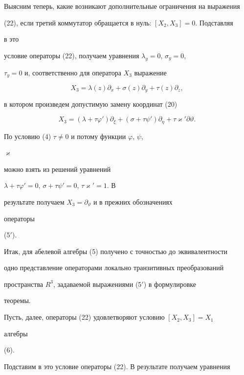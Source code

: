 Выясним теперь, какие возникают дополнительные ограничения на выражения 


(22), если третий коммутатор обращается в нуль: $[X_2,X_3]=0$. Подставляя 


в это 


условие операторы (22), получаем уравнения $\lambda_y=0$, $\sigma_y=0$, 


$\tau_y=0$ и, соответственно для оператора $X_3$ выражение


$$ 


X_3=\lambda(z)\partial_x+\sigma(z)\partial_y+\tau(z)\partial_z, 


$$ 


в котором произведем допустимую замену координат (20)


$$ 


X_3=(\lambda+\tau\varphi')\partial_\xi+ 


(\sigma+\tau\psi')\partial_\eta+ 


\tau\varkappa'\partial\vartheta. 


$$ 


 


По условию (4) $\tau\ne 0$ и потому функции $\varphi$, $\psi$, 


$\varkappa$ 


можно взять из решений уравнений 


$\lambda+\tau\varphi'=0$, $\sigma+\tau\psi'=0$, $\tau\varkappa'=1$. В 


результате получаем $X_3=\partial_\vartheta$ и в прежних обозначениях 


операторы 


(5${}'$). 


 


Итак, для абелевой алгебры (5) получено с точностью до эквивалентности 


одно представление операторами локально транзитивных преобразований 


пространства $R^3$, задаваемой выражениями (5${}'$) в формулировке 


теоремы. 


 


Пусть, далее, операторы (22) удовлетворяют условию $[X_2,X_3]=X_1$ 


алгебры 


(6). 


Подставим в это условие операторы (22). В результате получаем уравнения 


